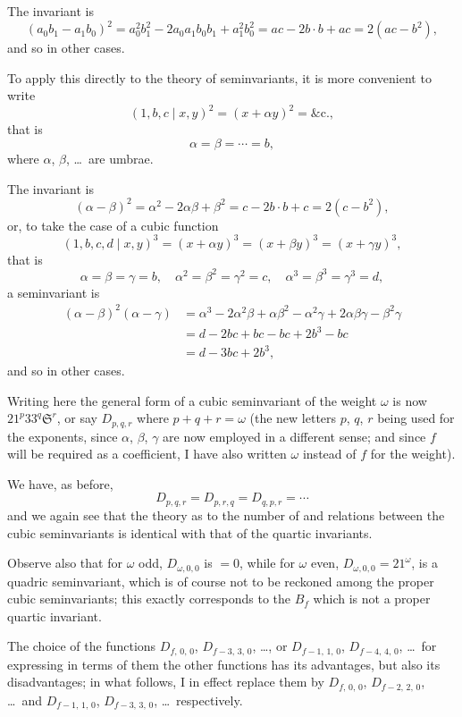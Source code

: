 \documentclass[11pt,a4paper]{book}
\begin{document}
The invariant is
\[
(a_0b_1 - a_1b_0)^2 = a_0^2b_1^2 - 2a_0a_1b_0b_1 + a_1^2b_0^2 = ac - 2b \cdot b + ac = 2(ac - b^2),
\]
and so in other cases.

To apply this directly to the theory of seminvariants, it is more convenient to write
\[
(1, b, c \mid x, y)^2 = (x + \alpha y)^2 = \text{\&c.},
\]
that is
\[
\alpha = \beta = \cdots = b,
\]
where $\alpha$, $\beta$, \ldots\ are umbrae.

The invariant is
\[
(\alpha - \beta)^2 = \alpha^2 - 2\alpha\beta + \beta^2 = c - 2b \cdot b + c = 2(c - b^2),
\]
or, to take the case of a cubic function
\[
(1, b, c, d \mid x, y)^3 = (x + \alpha y)^3 = (x + \beta y)^3 = (x + \gamma y)^3,
\]
that is
\[
\alpha = \beta = \gamma = b, \quad \alpha^2 = \beta^2 = \gamma^2 = c, \quad \alpha^3 = \beta^3 = \gamma^3 = d,
\]
a seminvariant is
\begin{align*}
(\alpha - \beta)^2(\alpha - \gamma) &= \alpha^3 - 2\alpha^2\beta + \alpha\beta^2 - \alpha^2\gamma + 2\alpha\beta\gamma - \beta^2\gamma\\
&= d - 2bc + bc - bc + 2b^3 - bc\\
&= d - 3bc + 2b^3,
\end{align*}
and so in other cases.

Writing here the general form of a cubic seminvariant of the weight $\omega$ is now $21^p 33^q \mathfrak{S}^r$, or say $D_{p,q,r}$ where $p + q + r = \omega$ (the new letters $p$, $q$, $r$ being used for the exponents, since $\alpha$, $\beta$, $\gamma$ are now employed in a different sense; and since $f$ will be required as a coefficient, I have also written $\omega$ instead of $f$ for the weight).

We have, as before,
\[
D_{p,q,r} = D_{p,r,q} = D_{q,p,r} = \cdots
\]
and we again see that the theory as to the number of and relations between the cubic seminvariants is identical with that of the quartic invariants.

Observe also that for $\omega$ odd, $D_{\omega,0,0}$ is $= 0$, while for $\omega$ even, $D_{\omega,0,0} = 21^{\omega}$, is a quadric seminvariant, which is of course not to be reckoned among the proper cubic seminvariants; this exactly corresponds to the $B_f$ which is not a proper quartic invariant.

The choice of the functions $D_{f,\,0,\,0}$, $D_{f-3,\,3,\,0}$, \ldots, or $D_{f-1,\,1,\,0}$, $D_{f-4,\,4,\,0}$, \ldots\ for expressing in terms of them the other functions has its advantages, but also its disadvantages; in what follows, I in effect replace them by $D_{f,\,0,\,0}$, $D_{f-2,\,2,\,0}$, \ldots\ and $D_{f-1,\,1,\,0}$, $D_{f-3,\,3,\,0}$, \ldots\ respectively.
\end{document}
